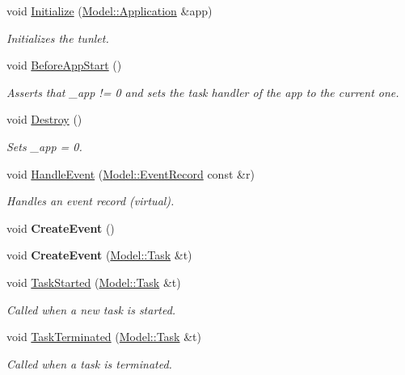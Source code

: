 \begin{DoxyCompactItemize}
\item 
void \hyperlink{class_my_tunlet_a1a43b296664b690282faa724f8e0e6e4}{Initialize} (\hyperlink{class_model_1_1_application}{Model\-::\-Application} \&app)
\begin{DoxyCompactList}\small\item\em Initializes the tunlet. \end{DoxyCompactList}\item 
\hypertarget{class_my_tunlet_acd86c1b956d58572b33c82e24edc4997}{void \hyperlink{class_my_tunlet_acd86c1b956d58572b33c82e24edc4997}{Before\-App\-Start} ()}\label{class_my_tunlet_acd86c1b956d58572b33c82e24edc4997}

\begin{DoxyCompactList}\small\item\em Asserts that \-\_\-app != 0 and sets the task handler of the app to the current one. \end{DoxyCompactList}\item 
\hypertarget{class_my_tunlet_a72e08d134dbefd3373538a8d678d772d}{void \hyperlink{class_my_tunlet_a72e08d134dbefd3373538a8d678d772d}{Destroy} ()}\label{class_my_tunlet_a72e08d134dbefd3373538a8d678d772d}

\begin{DoxyCompactList}\small\item\em Sets \-\_\-app = 0. \end{DoxyCompactList}\item 
void \hyperlink{class_my_tunlet_af1b66922cbdce93415ef288ca36b3106}{Handle\-Event} (\hyperlink{class_model_1_1_event_record}{Model\-::\-Event\-Record} const \&r)
\begin{DoxyCompactList}\small\item\em Handles an event record (virtual). \end{DoxyCompactList}\item 
\hypertarget{class_my_tunlet_a3e39fdac93b5f03be7e6cfce3dda6619}{void {\bfseries Create\-Event} ()}\label{class_my_tunlet_a3e39fdac93b5f03be7e6cfce3dda6619}

\item 
\hypertarget{class_my_tunlet_abe4efe380551313dd3b4b0c606d182c3}{void {\bfseries Create\-Event} (\hyperlink{class_model_1_1_task}{Model\-::\-Task} \&t)}\label{class_my_tunlet_abe4efe380551313dd3b4b0c606d182c3}

\item 
void \hyperlink{class_my_tunlet_aba791586506c8aace6668e0d9c78a2ed}{Task\-Started} (\hyperlink{class_model_1_1_task}{Model\-::\-Task} \&t)
\begin{DoxyCompactList}\small\item\em Called when a new task is started. \end{DoxyCompactList}\item 
void \hyperlink{class_my_tunlet_a1dbfd5d056e172441e58e182ab38bf1b}{Task\-Terminated} (\hyperlink{class_model_1_1_task}{Model\-::\-Task} \&t)
\begin{DoxyCompactList}\small\item\em Called when a task is terminated. \end{DoxyCompactList}\end{DoxyCompactItemize}


